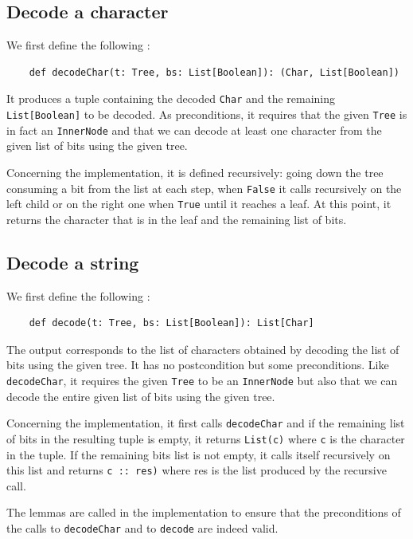 \documentclass[a4paper,UKenglish,cleveref, autoref, thm-restate]{lipics-v2021}
\begin{document}
\subsection{Decode a character}
We first define the following :

\begin{lstlisting}
    def decodeChar(t: Tree, bs: List[Boolean]): (Char, List[Boolean])
\end{lstlisting}

It produces a tuple containing the decoded \lstinline{Char} and the remaining \lstinline{List[Boolean]} to be decoded.
As preconditions, it requires that the given \lstinline{Tree} is in fact an \lstinline{InnerNode} and that we can decode at least one character from the given list of bits using the given tree.

Concerning the implementation, it is defined recursively: going down the tree consuming a bit from the list at each step, when \lstinline{False} it calls recursively on the left child or on the right one when \lstinline{True} until it reaches a leaf. At this point,
it returns the character that is in the leaf and the remaining list of bits.

\subsection{Decode a string}
We first define the following :

\begin{lstlisting}
    def decode(t: Tree, bs: List[Boolean]): List[Char]
\end{lstlisting}

The output corresponds to the list of characters obtained by decoding the list of bits using the given tree.
It has no postcondition but some preconditions. Like \lstinline{decodeChar}, it requires the given \lstinline{Tree} to be an \lstinline{InnerNode} but also that we can decode the entire given list of bits using the given tree.

Concerning the implementation, it first calls \lstinline{decodeChar} and if the remaining list of bits in the resulting tuple is empty, it returns \lstinline{List(c)} where \lstinline{c} is the character in the tuple. If the remaining bits list is not empty,
it calls itself recursively on this list and returns \lstinline{c :: res)} where res is the list produced by the recursive call.

The lemmas are called in the implementation to ensure that the preconditions of the calls to \lstinline{decodeChar} and to \lstinline{decode} are indeed valid.
\end{document}
